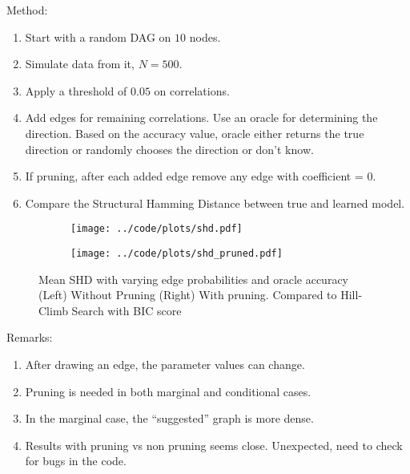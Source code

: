 \documentclass[letterpaper]{article}
\begin{document}
Method:
\begin{enumerate}
	\item Start with a random DAG on $ 10 $ nodes.
	\item Simulate data from it, $ N = 500 $.
	\item Apply a threshold of $ 0.05 $ on correlations.
	\item Add edges for remaining correlations. Use an oracle for determining the direction. Based on the accuracy value, oracle either returns the true direction or randomly chooses the direction or don't know.
	\item If pruning, after each added edge remove any edge with coefficient = 0.
	\item Compare the Structural Hamming Distance between true and learned model.
\end{enumerate}

\begin{figure}[H]
	\begin{subfigure}{0.5 \textwidth}
		\centering
		\texttt{[image: ../code/plots/shd.pdf]}
	\end{subfigure}%
	\begin{subfigure}{0.5 \textwidth}
		\centering
		\texttt{[image: ../code/plots/shd\_pruned.pdf]}
	\end{subfigure}
		\caption{Mean SHD with varying edge probabilities and oracle accuracy (Left) Without Pruning (Right) With pruning. Compared to Hill-Climb Search with BIC score}
\end{figure}

Remarks:
\begin{enumerate}
	\item After drawing an edge, the parameter values can change.
	\item Pruning is needed in both marginal and conditional cases.
	\item In the marginal case, the ``suggested'' graph is more dense.
	\item Results with pruning vs non pruning seems close. Unexpected, need to check for bugs in the code.
\end{enumerate}
\end{document}

